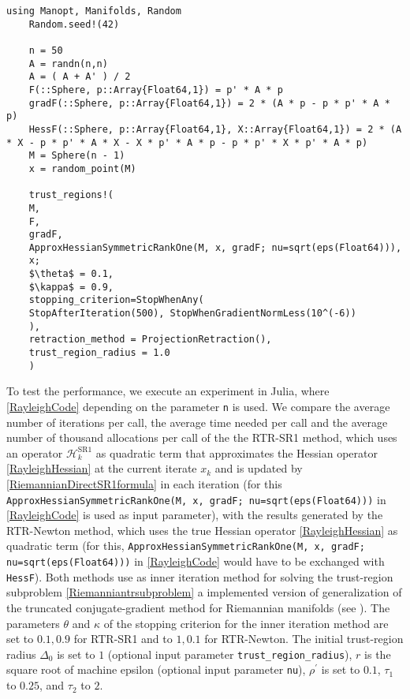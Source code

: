 \newpage

\begin{lstlisting}[mathescape, caption={The Rayleigh quotient minimization experiment in Julia for $n = 500$.}, label={RayleighCode}]
    using Manopt, Manifolds, Random
    Random.seed!(42)

    n = 50
    A = randn(n,n)
    A = ( A + A' ) / 2
    F(::Sphere, p::Array{Float64,1}) = p' * A * p
    gradF(::Sphere, p::Array{Float64,1}) = 2 * (A * p - p * p' * A * p)
    HessF(::Sphere, p::Array{Float64,1}, X::Array{Float64,1}) = 2 * (A * X - p * p' * A * X - X * p' * A * p - p * p' * X * p' * A * p)
    M = Sphere(n - 1)
    x = random_point(M)

    trust_regions!(
    M,
    F,
    gradF,
    ApproxHessianSymmetricRankOne(M, x, gradF; nu=sqrt(eps(Float64))),
    x;
    $\theta$ = 0.1,
    $\kappa$ = 0.9,
    stopping_criterion=StopWhenAny(
    StopAfterIteration(500), StopWhenGradientNormLess(10^(-6))
    ),
    retraction_method = ProjectionRetraction(),
    trust_region_radius = 1.0
    )
\end{lstlisting}
To test the performance, we execute an experiment in Julia, where \cref{RayleighCode} depending on the parameter \lstinline!n! is used. We compare the average number of iterations per call, the average time needed per call and the average number of thousand allocations per call of the the RTR-SR1 method, which uses an operator $\mathcal{H}^{\mathrm{SR1}}_k$ as quadratic term that approximates the Hessian operator \cref{RayleighHessian} at the current iterate $x_k$ and is updated by \cref{RiemannianDirectSR1formula} in each iteration (for this \lstinline!ApproxHessianSymmetricRankOne(M, x, gradF; nu=sqrt(eps(Float64)))! in \cref{RayleighCode} is used as input parameter), with the results generated by the RTR-Newton method, which uses the true Hessian operator \cref{RayleighHessian} as quadratic term (for this, \lstinline!ApproxHessianSymmetricRankOne(M, x, gradF; nu=sqrt(eps(Float64)))! in \cref{RayleighCode} would have to be exchanged with \lstinline!HessF!). Both methods use as inner iteration method for solving the trust-region subproblem \cref{Riemanniantrsubproblem} a implemented version of generalization of the truncated conjugate-gradient method for Riemannian manifolds (see \cite[Algorithm~11]{AbsilMahonySepulchre:2008}). The parameters $\theta$ and $\kappa$ of the stopping criterion \cite[(7.10)]{AbsilMahonySepulchre:2008} for the inner iteration method are set to $0.1, 0.9$ for RTR-SR1 and to $1, 0.1$ for RTR-Newton. The initial trust-region radius $\Delta_0$ is set to $1$ (optional input parameter \lstinline!trust_region_radius!), $r$ is the square root of machine epsilon (optional input parameter \lstinline!nu!), $\rho^{\prime}$ is set to $0.1$, $\tau_1$ to $0.25$, and $\tau_2$ to $2$. \\
